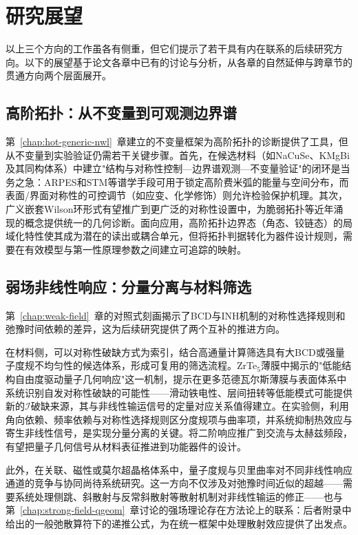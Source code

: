 \section{研究展望}

以上三个方向的工作虽各有侧重，但它们提示了若干具有内在联系的后续研究方向。以下的展望基于论文各章中已有的讨论与分析，从各章的自然延伸与跨章节的贯通方向两个层面展开。

\subsection{高阶拓扑：从不变量到可观测边界谱}

第~\ref{chap:hot-generic-nwl}~章建立的不变量框架为高阶拓扑的诊断提供了工具，但从不变量到实验验证仍需若干关键步骤。首先，在候选材料（如NaCuSe、KMgBi及其同构体系）中建立"结构与对称性控制—边界谱观测—不变量验证"的闭环是当务之急：ARPES和STM等谱学手段可用于锁定高阶费米弧的能量与空间分布，而表面/界面对称性的可控调节（如应变、化学修饰）则允许检验保护机理。其次，广义嵌套Wilson环形式有望推广到更广泛的对称性设置中，为脆弱拓扑\cite{PhysRevLett.123.186401,PhysRevB.100.115160,PhysRevB.100.205126}等近年涌现的概念提供统一的几何诊断。面向应用，高阶拓扑边界态（角态、铰链态）的局域化特性使其成为潜在的读出或耦合单元，但将拓扑判据转化为器件设计规则，需要在有效模型与第一性原理参数之间建立可追踪的映射。

\subsection{弱场非线性响应：分量分离与材料筛选}

第~\ref{chap:weak-field}~章的对照式刻画揭示了BCD与INH机制的对称性选择规则和弛豫时间依赖的差异，这为后续研究提供了两个互补的推进方向。

在材料侧，可以对称性破缺方式为索引，结合高通量计算筛选具有大BCD或强量子度规不均匀性的候选体系，形成可复用的筛选流程。ZrTe$_5$薄膜中揭示的"低能结构自由度驱动量子几何响应"这一机制，提示在更多范德瓦尔斯薄膜与表面体系中系统识别自发对称性破缺的可能性——滑动铁电性、层间扭转等低能模式可能提供新的$\mathcal{I}$破缺来源，其与非线性输运信号的定量对应关系值得建立。在实验侧，利用角向依赖、频率依赖与对称性选择规则区分度规项与曲率项，并系统抑制热效应与寄生非线性信号，是实现分量分离的关键。将二阶响应推广到交流与太赫兹频段，有望把量子几何信号从材料表征推进到功能器件的设计。

此外，在关联、磁性或莫尔超晶格体系中，量子度规与贝里曲率对不同非线性响应通道的竞争与协同尚待系统研究。这一方向不仅涉及对弛豫时间近似的超越——需要系统处理侧跳\cite{Du2021NonlinearHE}、斜散射\cite{Du2021NonlinearHE}与反常斜散射\cite{PhysRevLett.131.076601}等散射机制对非线性输运的修正——也与第~\ref{chap:strong-field-qgeom}~章讨论的强场理论存在方法论上的联系：后者附录中给出的一般弛散算符下的递推公式，为在统一框架中处理散射效应提供了出发点。

